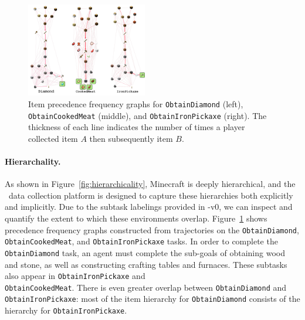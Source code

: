     \begin{figure}
        \begin{center}
            \vspace{-15pt}
            \includegraphics[width=0.47\textwidth]{./assets/item_graphs.png}
            \caption{\small Item precedence frequency graphs for \texttt{ObtainDiamond} (left), \texttt{ObtainCookedMeat} (middle), and \texttt{ObtainIronPickaxe} (right). The thickness of each line indicates the number of times a player collected item $A$ then subsequently item $B$. } \label{fig:task_hist}
            \vspace{-18pt}
        \end{center}
    \end{figure}
 

\paragraph{Hierarchality.} 

As shown in Figure~\ref{fig:hierarchicality}, Minecraft is deeply hierarchical, and the \minenet~data collection platform is designed to capture these hierarchies both explicitly and implicitly. 
Due to the subtask labelings provided in \minenet-v0, we can inspect and quantify the extent to which these environments overlap. 
Figure~\ref{fig:task_hist} shows precedence frequency graphs constructed from \minenet{} trajectories on the \texttt{ObtainDiamond}, \texttt{Obtain}\texttt{CookedMeat}, and \texttt{ObtainIronPickaxe} tasks.
In order to complete the \texttt{ObtainDiamond} task, an agent must complete the sub-goals of obtaining wood and stone, as well as constructing crafting tables and furnaces.
These subtasks also appear in \texttt{ObtainIronPickaxe} and \\ \texttt{ObtainCookedMeat}.
There is even greater overlap between \texttt{ObtainDiamond}
and \texttt{ObtainIronPickaxe}: most of the item hierarchy for \texttt{ObtainDiamond} consists of the hierarchy for \texttt{ObtainIronPickaxe}.


